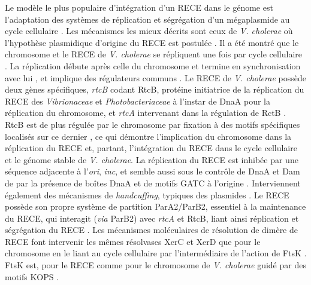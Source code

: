 Le modèle le plus populaire d'intégration d'un RECE dans le génome est l'adaptation des systèmes de réplication et ségrégation d'un mégaplasmide au cycle cellulaire \citep{Heidelberg2000,MacLellan2004}. Les mécanismes les mieux décrits sont ceux de \textit{V. cholerae} où l'hypothèse plasmidique d'origine du RECE est postulée \citep{egan2003distinct}. Il a été montré que le chromosome et le RECE de \textit{V. cholerae} se répliquent une fois par cycle cellulaire \citep{srivastava2007selective,stokke2011replication}. La réplication débute après celle du chromosome et termine en synchronisation avec lui \citep{rasmussen2007two,stokke2011replication}, et implique des régulateurs communs \citep{Egan2005,demarre2010dna}. Le RECE de \textit{V. cholerae} possède deux gènes spécifiques, \textit{rtcB} codant RtcB, protéine initiatrice de la réplication du RECE des \textit{Vibrionaceae} et \textit{Photobacteriaceae} à l'instar de DnaA pour la réplication du chromosome, et \textit{rtcA} intervenant dans la régulation de RctB \citep{duigou2006independent}. RtcB est de plus régulée par le chromosome par fixation à des motifs spécifiques localisés sur ce dernier \citep{baek2014chromosome}, ce qui démontre l'implication du chromosome dans la réplication du RECE et, partant, l'intégration du RECE dans le cycle cellulaire et le génome stable de \textit{V. cholerae}. La réplication du RECE est inhibée par une séquence adjacente à l'\textit{ori}, \textit{inc}, et semble aussi sous le contrôle de DnaA et Dam de par la présence de boîtes DnaA et de motifs GATC à l'origine \citep{egan2006autorepression,saint2008excess}. Interviennent également des mécanismes de \textit{handcuffing}, typiques des plasmides \citep{egan2003distinct,Egan2005,zakrzewska2007regulation}. Le RECE possède son propre système de partition ParA2/ParB2, essentiel à la maintenance du RECE, qui interagit (\textit{via} ParB2) avec \textit{rtcA} et RtcB, liant ainsi  réplication et ségrégation du RECE \citep{yamaichi2011regulatory}. Les mécanismes moléculaires de résolution de dimère de RECE font intervenir les mêmes résolvases XerC et XerD que pour le chromosome en le liant au cycle cellulaire par l'intermédiaire de l'action de FtsK \citep{Val2008}. FtsK est, pour le RECE comme pour le chromosome de \textit{V. cholerae} guidé par des motifs KOPS \citep{Val2008}.  \\

